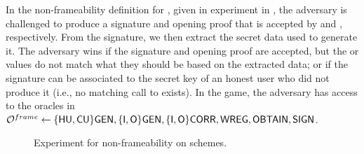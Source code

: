 In the non-frameability definition for \UAS, given in experiment \ExpNonframe in
, the adversary is challenged to produce a signature
and opening proof that is accepted by \Verify and \Judge, respectively. From
the signature, we then extract the secret data used to generate it. The
adversary wins if the signature and opening proof are accepted, but the \yeval
or \yinsp values do not match what they should be based on the extracted data;
or if the signature can be associated to the secret key of an honest user who
did not produce it (i.e., no matching call to \SIGN exists). In the game, the
adversary has access to the oracles in $\mathcal{O}^{frame} \gets
\lbrace\mathsf{HU},\mathsf{CU}\rbrace\mathsf{GEN}, \lbrace\mathsf{I},\mathsf{O}\rbrace\mathsf{GEN},\lbrace\mathsf{I},\mathsf{O}\rbrace\mathsf{CORR},
\mathsf{WREG},\mathsf{OBTAIN},\mathsf{SIGN}$.

\begin{figure}[htp!]  
  \centering
  \caption{Experiment for non-frameability on \UAS schemes.}
  \label{fig:exp-uas-frame}
\end{figure}

